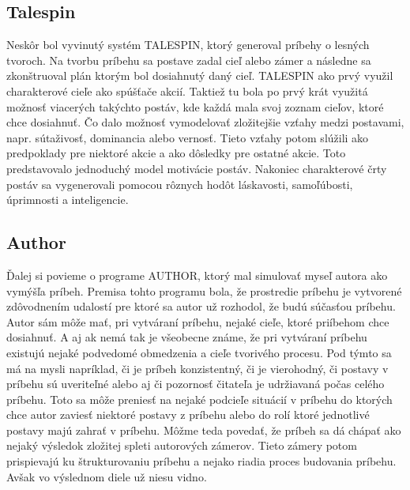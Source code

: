 \subsection{Talespin}
Neskôr bol vyvinutý systém TALESPIN, ktorý generoval príbehy o lesných tvoroch. Na tvorbu príbehu sa postave zadal cieľ alebo zámer a následne sa zkonštruoval plán ktorým bol dosiahnutý daný cieľ. TALESPIN ako prvý využil charakterové cieľe ako spúšťače akcií. Taktiež tu bola po prvý krát využitá možnosť viacerých takýchto postáv, kde každá mala svoj zoznam cieľov, ktoré chce dosiahnuť. Čo dalo možnosť vymodelovať zložitejšie vzťahy medzi postavami, napr. sútaživosť, dominancia alebo vernosť. Tieto vzťahy potom slúžili ako predpoklady pre niektoré akcie a ako dôsledky pre ostatné akcie. Toto predstavovalo jednoduchý model motivácie postáv. Nakoniec charakterové črty postáv sa vygenerovali pomocou rôznych hodôt láskavosti, samoľúbosti, úprimnosti a inteligencie.\par
\subsection{Author}
Ďalej si povieme o programe AUTHOR, ktorý mal simulovať myseľ autora ako vymýšľa príbeh. Premisa tohto programu bola, že prostredie príbehu je vytvorené zdôvodnením udalostí pre ktoré sa autor už rozhodol, že budú súčasťou príbehu. Autor sám môže mať, pri vytváraní príbehu, nejaké cieľe, ktoré priíbehom chce dosiahnuť. A aj ak nemá tak je všeobecne známe, že pri vytváraní príbehu existujú nejaké podvedomé obmedzenia a cieľe tvorivého procesu. Pod týmto sa má na mysli napríklad, či je príbeh konzistentný, či je vierohodný, či postavy v príbehu sú uveriteľné alebo aj či pozornosť čitateľa je udržiavaná počas celého príbehu. Toto sa môže preniesť na nejaké podcieľe situácií v príbehu do ktorých chce autor zaviesť niektoré postavy z príbehu alebo do rolí ktoré jednotlivé postavy majú zahrať v príbehu. Môžme teda povedať, že príbeh sa dá chápať ako nejaký výsledok zložitej spleti autorových zámerov. Tieto zámery potom prispievajú ku štrukturovaniu príbehu a nejako riadia proces budovania príbehu. Avšak vo výslednom diele už niesu vidno.\par
